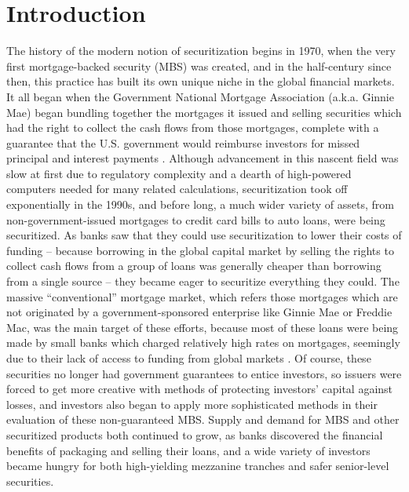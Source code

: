 \documentclass[12pt]{article}
\begin{document}
\section*{Introduction}

The history of the modern notion of securitization begins in 1970, when the very first mortgage-backed security (MBS) was created, and in the half-century since then, this practice has built its own unique niche in the global financial markets. It all began when the Government National Mortgage Association (a.k.a. Ginnie Mae) began bundling together the mortgages it issued and selling securities which had the right to collect the cash flows from those mortgages, complete with a guarantee that the U.S. government would reimburse investors for missed principal and interest payments \parencite{segoviano13}. Although advancement in this nascent field was slow at first due to regulatory complexity and a dearth of high-powered computers needed for many related calculations, securitization took off exponentially in the 1990s, and before long, a much wider variety of assets, from non-government-issued mortgages to credit card bills to auto loans, were being securitized. As banks saw that they could use securitization to lower their costs of funding – because borrowing in the global capital market by selling the rights to collect cash flows from a group of loans was generally cheaper than borrowing from a single source – they became eager to securitize everything they could. The massive “conventional” mortgage market, which refers those mortgages which are not originated by a government-sponsored enterprise like Ginnie Mae or Freddie Mac, was the main target of these efforts, because most of these loans were being made by small banks which charged relatively high rates on mortgages, seemingly due to their lack of access to funding from global markets \parencite{brendsel98}. Of course, these securities no longer had government guarantees to entice investors, so issuers were forced to get more creative with methods of protecting investors’ capital against losses, and investors also began to apply more sophisticated methods in their evaluation of these non-guaranteed MBS. Supply and demand for MBS and other securitized products both continued to grow, as banks discovered the financial benefits of packaging and selling their loans, and a wide variety of investors became hungry for both high-yielding mezzanine tranches and safer senior-level securities.
\end{document}
